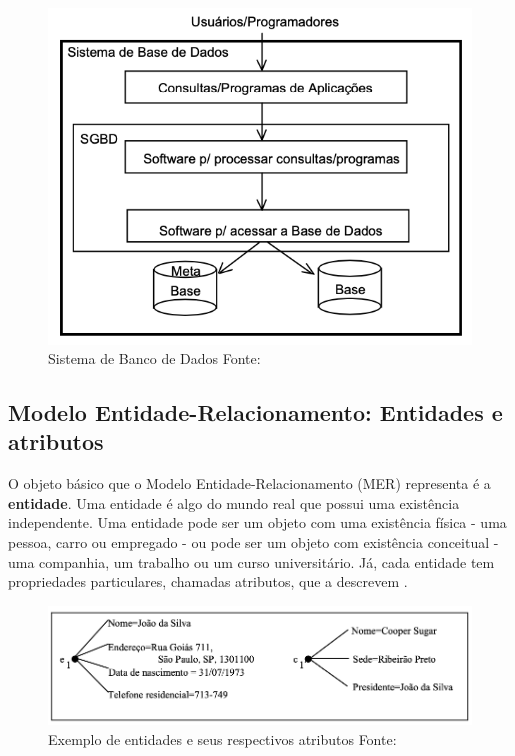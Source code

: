 \begin{figure}[H]
	\centering
		\includegraphics[scale=0.4]{imagens/sdbd.png}
	\caption{
		Sistema de Banco de Dados
		Fonte: \cite{takai2005introduccao}
	}
	\label{fig:sdbd}
\end{figure}

\subsection{Modelo Entidade-Relacionamento: Entidades e atributos}

O objeto básico que o Modelo Entidade-Relacionamento (MER) representa é a \textbf{entidade}. Uma entidade é algo do mundo real que possui uma existência independente. Uma entidade pode ser um objeto com uma existência física - uma pessoa, carro ou empregado - ou pode ser um objeto com existência conceitual - uma companhia, um trabalho ou um curso universitário. Já, cada entidade tem propriedades particulares, chamadas atributos, que a descrevem \cite{takai2005introduccao}.

\begin{figure}[H]
	\centering
	\includegraphics[scale=0.4]{imagens/entidade-atributos.png}
	\caption{
		Exemplo de entidades e seus respectivos atributos
		Fonte: \cite{takai2005introduccao}
	}
	\label{fig:entidade-atributos}
\end{figure}

